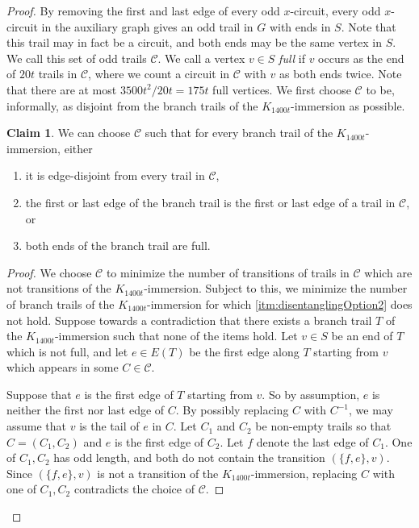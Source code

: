 \documentclass{article}
\theoremstyle{definition}
\newtheorem{claim}{Claim}[environment]
\begin{document}
\begin{proof}
    By removing the first and last edge of every odd $x$-circuit, every odd $x$-circuit in the auxiliary graph gives an odd trail in $G$ with ends in $S$. Note that this trail may in fact be a circuit, and both ends may be the same vertex in $S$. We call this set of odd trails $\mathcal{C}$. We call a vertex $v \in S$ \emph{full} if $v$ occurs as the end of $20t$ trails in $\mathcal{C}$, where we count a circuit in $\mathcal{C}$ with $v$ as both ends twice. Note that there are at most $3500t^2/20t=175t$ full vertices. We first choose $\mathcal{C}$ to be, informally, as disjoint from the branch trails of the $K_{1400t}$-immersion as possible.

    \begin{claim}\label{claim:DisentanglingCircuits}
        We can choose $\mathcal{C}$ such that for every branch trail of the $K_{1400t}$-immersion, either
        \begin{enumerate}
            \item it is edge-disjoint from every trail in $\mathcal{C}$,
            \item\label{itm:disentanglingOption2} the first or last edge of the branch trail is the first or last edge of a trail in $\mathcal{C}$, or
            \item both ends of the branch trail are full.
        \end{enumerate}
    \end{claim}
    \begin{proof}
        We choose $\mathcal{C}$ to minimize the number of transitions of trails in $\mathcal{C}$ which are not transitions of the $K_{1400t}$-immersion. Subject to this, we minimize the number of branch trails of the $K_{1400t}$-immersion for which \cref{itm:disentanglingOption2} does not hold. Suppose towards a contradiction that there exists a branch trail $T$ of the $K_{1400t}$-immersion such that none of the items hold. Let $v \in S$ be an end of $T$ which is not full, and let $e \in E(T)$ be the first edge along $T$ starting from $v$ which appears in some $C \in \mathcal{C}$.

        Suppose that $e$ is the first edge of $T$ starting from $v$. So by assumption, $e$ is neither the first nor last edge of $C$. By possibly replacing $C$ with $C^{-1}$, we may assume that $v$ is the tail of $e$ in $C$. Let $C_1$ and $C_2$ be non-empty trails so that $C = (C_1, C_2)$ and $e$ is the first edge of $C_2$. Let $f$ denote the last edge of $C_1$. One of $C_1, C_2$ has odd length, and both do not contain the transition $(\{f, e\}, v)$. Since $(\{f, e\}, v)$ is not a transition of the $K_{1400t}$-immersion, replacing $C$ with one of $C_1, C_2$ contradicts the choice of $\mathcal{C}$.
        

\end{proof}
\end{proof}
\end{document}

